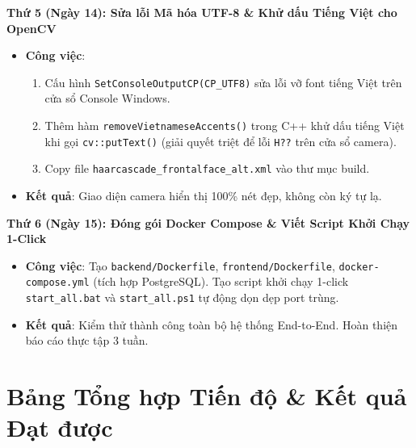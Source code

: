 \documentclass[12pt,a4paper]{article}
\begin{document}
\begin{daybox}
\textbf{Thứ 5 (Ngày 14): Sửa lỗi Mã hóa UTF-8 \& Khử dấu Tiếng Việt cho OpenCV}
\begin{itemize}[leftmargin=*]
    \item \textbf{Công việc}:
    \begin{enumerate}
        \item Cấu hình \texttt{SetConsoleOutputCP(CP\_UTF8)} sửa lỗi vỡ font tiếng Việt trên cửa sổ Console Windows.
        \item Thêm hàm \texttt{removeVietnameseAccents()} trong C++ khử dấu tiếng Việt khi gọi \texttt{cv::putText()} (giải quyết triệt để lỗi \texttt{H??} trên cửa sổ camera).
        \item Copy file \texttt{haarcascade\_frontalface\_alt.xml} vào thư mục build.
    \end{enumerate}
    \item \textbf{Kết quả}: Giao diện camera hiển thị 100\% nét đẹp, không còn ký tự lạ.
\end{itemize}
\end{daybox}

\begin{daybox}
\textbf{Thứ 6 (Ngày 15): Đóng gói Docker Compose \& Viết Script Khởi Chạy 1-Click}
\begin{itemize}[leftmargin=*]
    \item \textbf{Công việc}: Tạo \texttt{backend/Dockerfile}, \texttt{frontend/Dockerfile}, \texttt{docker-compose.yml} (tích hợp PostgreSQL). Tạo script khởi chạy 1-click \texttt{start\_all.bat} và \texttt{start\_all.ps1} tự động dọn dẹp port trùng.
    \item \textbf{Kết quả}: Kiểm thử thành công toàn bộ hệ thống End-to-End. Hoàn thiện báo cáo thực tập 3 tuần.
\end{itemize}
\end{daybox}

\newpage

\section{Bảng Tổng hợp Tiến độ \& Kết quả Đạt được}
\end{document}
